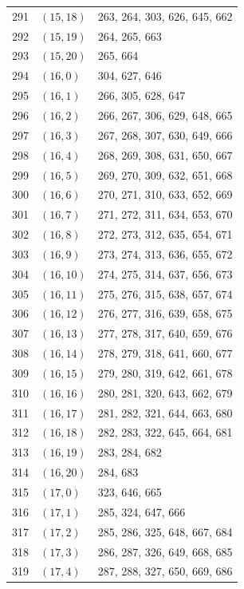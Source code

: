 \documentclass{article}
\begin{document}
\begin{longtable}{lll}
  291 & \((15, 18)\) & 263, 264, 303, 626, 645, 662 \\
  292 & \((15, 19)\) & 264, 265, 663 \\
  293 & \((15, 20)\) & 265, 664 \\
  294 & \((16, 0)\) & 304, 627, 646 \\
  295 & \((16, 1)\) & 266, 305, 628, 647 \\
  296 & \((16, 2)\) & 266, 267, 306, 629, 648, 665 \\
  297 & \((16, 3)\) & 267, 268, 307, 630, 649, 666 \\
  298 & \((16, 4)\) & 268, 269, 308, 631, 650, 667 \\
  299 & \((16, 5)\) & 269, 270, 309, 632, 651, 668 \\
  300 & \((16, 6)\) & 270, 271, 310, 633, 652, 669 \\
  301 & \((16, 7)\) & 271, 272, 311, 634, 653, 670 \\
  302 & \((16, 8)\) & 272, 273, 312, 635, 654, 671 \\
  303 & \((16, 9)\) & 273, 274, 313, 636, 655, 672 \\
  304 & \((16, 10)\) & 274, 275, 314, 637, 656, 673 \\
  305 & \((16, 11)\) & 275, 276, 315, 638, 657, 674 \\
  306 & \((16, 12)\) & 276, 277, 316, 639, 658, 675 \\
  307 & \((16, 13)\) & 277, 278, 317, 640, 659, 676 \\
  308 & \((16, 14)\) & 278, 279, 318, 641, 660, 677 \\
  309 & \((16, 15)\) & 279, 280, 319, 642, 661, 678 \\
  310 & \((16, 16)\) & 280, 281, 320, 643, 662, 679 \\
  311 & \((16, 17)\) & 281, 282, 321, 644, 663, 680 \\
  312 & \((16, 18)\) & 282, 283, 322, 645, 664, 681 \\
  313 & \((16, 19)\) & 283, 284, 682 \\
  314 & \((16, 20)\) & 284, 683 \\
  315 & \((17, 0)\) & 323, 646, 665 \\
  316 & \((17, 1)\) & 285, 324, 647, 666 \\
  317 & \((17, 2)\) & 285, 286, 325, 648, 667, 684 \\
  318 & \((17, 3)\) & 286, 287, 326, 649, 668, 685 \\
  319 & \((17, 4)\) & 287, 288, 327, 650, 669, 686 \\

\end{longtable}
\end{document}
